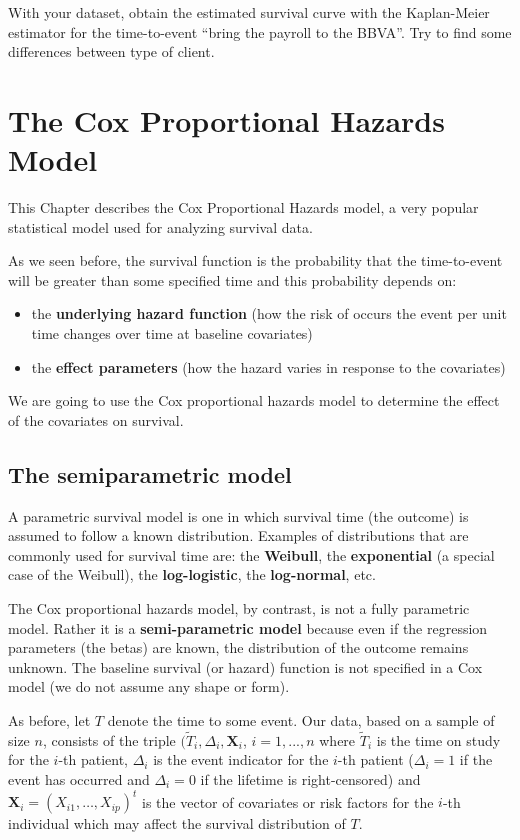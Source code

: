 \documentclass[]{book}
\theoremstyle{definition}
\theoremstyle{definition}
\theoremstyle{definition}
\theoremstyle{remark}
\let\BeginKnitrBlock\begin \let\EndKnitrBlock\end
\begin{document}
\BeginKnitrBlock{rmdexercise_sestelo}
With your dataset, obtain the estimated survival curve with the
Kaplan-Meier estimator for the time-to-event ``bring the payroll to the
BBVA''. Try to find some differences between type of client.
\EndKnitrBlock{rmdexercise_sestelo}

\chapter{The Cox Proportional Hazards Model}\label{cox}

This Chapter describes the Cox Proportional Hazards model, a very
popular statistical model used for analyzing survival data.

As we seen before, the survival function is the probability that the
time-to-event will be greater than some specified time and this
probability depends on:

\begin{itemize}
\item
  the \textbf{underlying hazard function} (how the risk of occurs the
  event per unit time changes over time at baseline covariates)
\item
  the \textbf{effect parameters} (how the hazard varies in response to
  the covariates)
\end{itemize}

We are going to use the Cox proportional hazards model to determine the
effect of the covariates on survival.

\section{The semiparametric model}\label{the-semiparametric-model}

A parametric survival model is one in which survival time (the outcome)
is assumed to follow a known distribution. Examples of distributions
that are commonly used for survival time are: the \textbf{Weibull}, the
\textbf{exponential} (a special case of the Weibull), the
\textbf{log-logistic}, the \textbf{log-normal}, etc.

The Cox proportional hazards model, by contrast, is not a fully
parametric model. Rather it is a \textbf{semi-parametric model} because
even if the regression parameters (the betas) are known, the
distribution of the outcome remains unknown. The baseline survival (or
hazard) function is not specified in a Cox model (we do not assume any
shape or form).

As before, let \(T\) denote the time to some event. Our data, based on a
sample of size \(n\), consists of the triple
\((\widetilde{T}_i, \Delta_i, \textbf{X}_i\), \(i = 1,...,n\) where
\(\widetilde{T}_i\) is the time on study for the \(i\)-th patient,
\(\Delta_i\) is the event indicator for the \(i\)-th patient
(\(\Delta_i=1\) if the event has occurred and \(\Delta_i=0\) if the
lifetime is right-censored) and
\(\textbf{X}_i= (X_{i1},\ldots, X_{ip})^t\) is the vector of covariates
or risk factors for the \(i\)-th individual which may affect the
survival distribution of \(T\).
\end{document}
